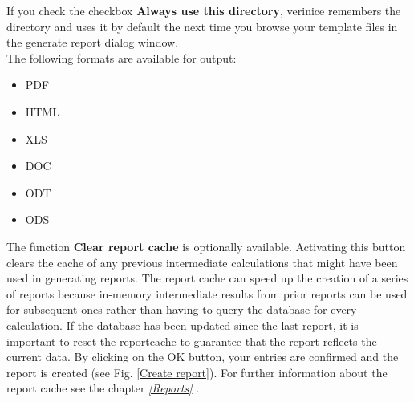 \documentclass[a4paper,10pt]{book}
\begin{document}
If you check the checkbox \textbf{Always use this directory}, verinice remembers the directory and uses it by default the next
time you browse your template files in the generate report dialog window.
\newline\\
The following formats are available for output:
\begin{itemize}
 \item \textsc{PDF}
 \item \textsc{HTML}
 \item \textsc{XLS}
 \item \textsc{DOC}
 \item \textsc{ODT}
 \item \textsc{ODS}
\end{itemize}
The function \textbf{Clear report cache} is optionally available.
Activating this button clears the cache of any previous intermediate calculations that might have been used in generating reports.
The report cache can speed up the creation of a series of reports because in-memory intermediate results from prior reports can be
used for subsequent ones rather than having to query the database for every calculation. If the database has been updated since the
last report, it is important to reset the reportcache to guarantee that the report reflects the current data.
\newline
By clicking on the OK button, your entries are confirmed and the report is created (see Fig. \ref{Create report}).
\newline
For further information about the report cache see the chapter {\em \ref{Reports} }.
\end{document}

